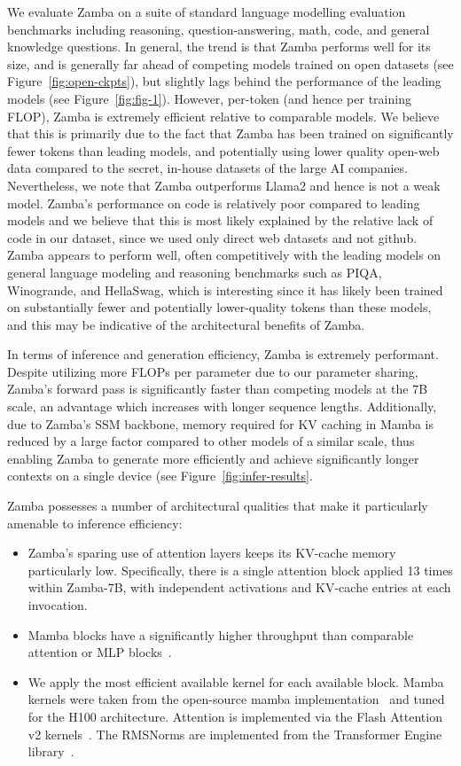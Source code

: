 We evaluate Zamba on a suite of standard language modelling evaluation benchmarks including reasoning, question-answering, math, code, and general knowledge questions. In general, the trend is that Zamba performs well for its size, and is generally far ahead of competing models trained on open datasets (see Figure~\ref{fig:open-ckpts}), but slightly lags behind the performance of the leading models (see Figure~\ref{fig:fig-1}). However, per-token (and hence per training FLOP), Zamba is extremely efficient relative to comparable models. We believe that this is primarily due to the fact that Zamba has been trained on significantly fewer tokens than leading models, and potentially using lower quality open-web data compared to the secret, in-house datasets of the large AI companies. Nevertheless, we note that Zamba outperforms Llama2 and hence is not a weak model. Zamba's performance on code is relatively poor compared to leading models and we believe that this is most likely explained by the relative lack of code in our dataset, since we used only direct web datasets and not github. Zamba appears to perform well, often competitively with the leading models on general language modeling and reasoning benchmarks such as PIQA, Winogrande, and HellaSwag, which is interesting since it has likely been trained on substantially fewer and potentially lower-quality tokens than these models, and this may be indicative of the architectural benefits of Zamba.

In terms of inference and generation efficiency, Zamba is extremely performant. Despite utilizing more FLOPs per parameter due to our parameter sharing, Zamba's forward pass is significantly faster than competing models at the 7B scale, an advantage which increases with longer sequence lengths. Additionally, due to Zamba's SSM backbone, memory required for KV caching in Mamba is reduced by a large factor compared to other models of a similar scale, thus enabling Zamba to generate more efficiently and achieve significantly longer contexts on a single device (see Figure~\ref{fig:infer-results}.

Zamba possesses a number of architectural qualities that make it particularly amenable to inference efficiency:

\begin{itemize}
    \item Zamba's sparing use of attention layers keeps its KV-cache memory particularly low. Specifically, there is a single attention block applied 13 times within Zamba-7B, with independent activations and KV-cache entries at each invocation.
    \item Mamba blocks have a significantly higher throughput than comparable attention or MLP blocks~\citep{gu2023mamba}.
    \item We apply the most efficient available kernel for each available block. Mamba kernels were taken from the open-source mamba implementation~\citep{gu2023mamba} and tuned for the H100 architecture. Attention is implemented via the Flash Attention v2 kernels~\citep{dao2023flashattention2}. The RMSNorms are implemented from the Transformer Engine library~\citep{transformer_engine}. 
\end{itemize}

